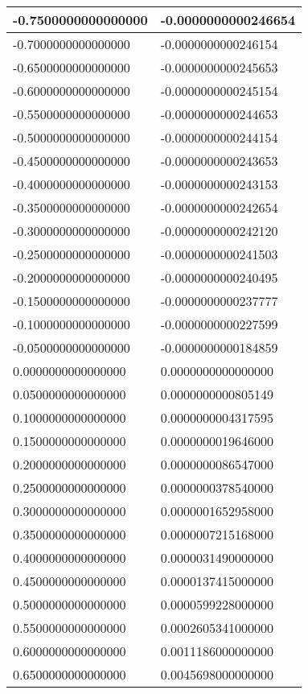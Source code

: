 \documentclass[a4paper,14pt]{article}
\begin{document}
\begin{longtable}{|l|l|}
-0.7500000000000000	&	-0.0000000000246654\\ \hline
-0.7000000000000000	&	-0.0000000000246154\\ \hline
-0.6500000000000000	&	-0.0000000000245653\\ \hline
-0.6000000000000000	&	-0.0000000000245154\\ \hline
-0.5500000000000000	&	-0.0000000000244653\\ \hline
-0.5000000000000000	&	-0.0000000000244154\\ \hline
-0.4500000000000000	&	-0.0000000000243653\\ \hline
-0.4000000000000000	&	-0.0000000000243153\\ \hline
-0.3500000000000000	&	-0.0000000000242654\\ \hline
-0.3000000000000000	&	-0.0000000000242120\\ \hline
-0.2500000000000000	&	-0.0000000000241503\\ \hline
-0.2000000000000000	&	-0.0000000000240495\\ \hline
-0.1500000000000000	&	-0.0000000000237777\\ \hline
-0.1000000000000000	&	-0.0000000000227599\\ \hline
-0.0500000000000000	&	-0.0000000000184859\\ \hline
0.0000000000000000	&	0.0000000000000000\\ \hline
0.0500000000000000	&	0.0000000000805149\\ \hline
0.1000000000000000	&	0.0000000004317595\\ \hline
0.1500000000000000	&	0.0000000019646000\\ \hline
0.2000000000000000	&	0.0000000086547000\\ \hline
0.2500000000000000	&	0.0000000378540000\\ \hline
0.3000000000000000	&	0.0000001652958000\\ \hline
0.3500000000000000	&	0.0000007215168000\\ \hline
0.4000000000000000	&	0.0000031490000000\\ \hline
0.4500000000000000	&	0.0000137415000000\\ \hline
0.5000000000000000	&	0.0000599228000000\\ \hline
0.5500000000000000	&	0.0002605341000000\\ \hline
0.6000000000000000	&	0.0011186000000000\\ \hline
0.6500000000000000	&	0.0045698000000000\\ \hline

\end{longtable}
\end{document}
